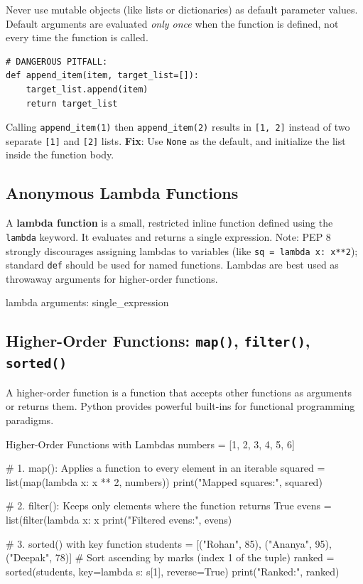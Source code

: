 \begin{commonmistake}
Never use mutable objects (like lists or dictionaries) as default parameter values. Default arguments are evaluated \textit{only once} when the function is defined, not every time the function is called.
\begin{lstlisting}[language=Python3]
# DANGEROUS PITFALL:
def append_item(item, target_list=[]): 
    target_list.append(item)
    return target_list
\end{lstlisting}
Calling \texttt{append\_item(1)} then \texttt{append\_item(2)} results in \texttt{[1, 2]} instead of two separate \texttt{[1]} and \texttt{[2]} lists. \textbf{Fix}: Use \texttt{None} as the default, and initialize the list inside the function body.
\end{commonmistake}

\subsection{Anonymous Lambda Functions}
A \textbf{lambda function} is a small, restricted inline function defined using the \texttt{lambda} keyword. It evaluates and returns a single expression. Note: PEP 8 strongly discourages assigning lambdas to variables (like \texttt{sq = lambda x: x**2}); standard \texttt{def} should be used for named functions. Lambdas are best used as throwaway arguments for higher-order functions.

\begin{syntaxbox}
lambda arguments: single\_expression
\end{syntaxbox}

\subsection{Higher-Order Functions: \texttt{map()}, \texttt{filter()}, \texttt{sorted()}}
A higher-order function is a function that accepts other functions as arguments or returns them. Python provides powerful built-ins for functional programming paradigms.

\begin{pythoncode}{Higher-Order Functions with Lambdas}
numbers = [1, 2, 3, 4, 5, 6]

# 1. map(): Applies a function to every element in an iterable
squared = list(map(lambda x: x ** 2, numbers))
print("Mapped squares:", squared)

# 2. filter(): Keeps only elements where the function returns True
evens = list(filter(lambda x: x %
print("Filtered evens:", evens)

# 3. sorted() with key function
students = [("Rohan", 85), ("Ananya", 95), ("Deepak", 78)]
# Sort ascending by marks (index 1 of the tuple)
ranked = sorted(students, key=lambda s: s[1], reverse=True)
print("Ranked:", ranked)
\end{pythoncode}


